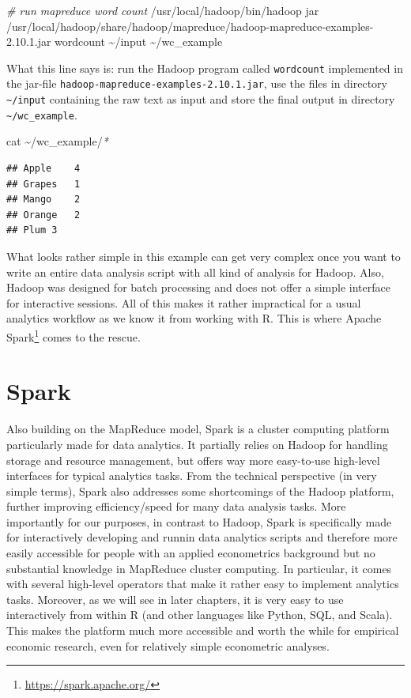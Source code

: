 \documentclass[
  12pt,
]{style/krantz}
\newenvironment{Shaded}{\begin{snugshade}}{\end{snugshade}}
\newcommand{\CommentTok}[1]{\textcolor[rgb]{0.56,0.35,0.01}{\textit{#1}}}
\newcommand{\ExtensionTok}[1]{#1}
\newcommand{\FunctionTok}[1]{\textcolor[rgb]{0.00,0.00,0.00}{#1}}
\newcommand{\NormalTok}[1]{#1}
\newcommand{\PreprocessorTok}[1]{\textcolor[rgb]{0.56,0.35,0.01}{\textit{#1}}}
\renewcommand{\href}[2]{#2\footnote{\url{#1}}}
\begin{document}
\begin{Shaded}
\begin{Highlighting}[]
\CommentTok{\# run mapreduce word count}
\ExtensionTok{/usr/local/hadoop/bin/hadoop}\NormalTok{ jar /usr/local/hadoop/share/hadoop/mapreduce/hadoop{-}mapreduce{-}examples{-}2.10.1.jar wordcount \textasciitilde{}/input \textasciitilde{}/wc\_example}
\end{Highlighting}
\end{Shaded}

What this line says is: run the Hadoop program called \texttt{wordcount} implemented in the jar-file \texttt{hadoop-mapreduce-examples-2.10.1.jar}, use the files in directory \texttt{\textasciitilde{}/input} containing the raw text as input and store the final output in directory \texttt{\textasciitilde{}/wc\_example}.

\begin{Shaded}
\begin{Highlighting}[]
\FunctionTok{cat}\NormalTok{ \textasciitilde{}/wc\_example/}\PreprocessorTok{*}
\end{Highlighting}
\end{Shaded}

\begin{verbatim}
## Apple    4
## Grapes   1
## Mango    2
## Orange   2
## Plum 3
\end{verbatim}

What looks rather simple in this example can get very complex once you want to write an entire data analysis script with all kind of analysis for Hadoop. Also, Hadoop was designed for batch processing and does not offer a simple interface for interactive sessions. All of this makes it rather impractical for a usual analytics workflow as we know it from working with R. This is where \href{https://spark.apache.org/}{Apache Spark} comes to the rescue.

\hypertarget{spark}{%
\section{Spark}\label{spark}}

Also building on the MapReduce model, Spark is a cluster computing platform particularly made for data analytics. It partially relies on Hadoop for handling storage and resource management, but offers way more easy-to-use high-level interfaces for typical analytics tasks. From the technical perspective (in very simple terms), Spark also addresses some shortcomings of the Hadoop platform, further improving efficiency/speed for many data analysis tasks. More importantly for our purposes, in contrast to Hadoop, Spark is specifically made for interactively developing and runnin data analytics scripts and therefore more easily accessible for people with an applied econometrics background but no substantial knowledge in MapReduce cluster computing. In particular, it comes with several high-level operators that make it rather easy to implement analytics tasks. Moreover, as we will see in later chapters, it is very easy to use interactively from within R (and other languages like Python, SQL, and Scala). This makes the platform much more accessible and worth the while for empirical economic research, even for relatively simple econometric analyses.
\end{document}
